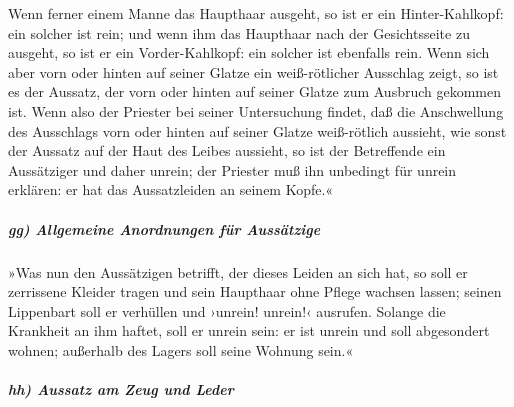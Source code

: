 Wenn ferner einem Manne das Haupthaar ausgeht, so ist er
ein Hinter-Kahlkopf: ein solcher ist rein; und wenn ihm
das Haupthaar nach der Gesichtsseite zu ausgeht, so ist er ein
Vorder-Kahlkopf: ein solcher ist ebenfalls rein. Wenn
sich aber vorn oder hinten auf seiner Glatze ein weiß-rötlicher
Ausschlag zeigt, so ist es der Aussatz, der vorn oder hinten auf seiner
Glatze zum Ausbruch gekommen ist. Wenn also der Priester
bei seiner Untersuchung findet, daß die Anschwellung des Ausschlags vorn
oder hinten auf seiner Glatze weiß-rötlich aussieht, wie sonst der
Aussatz auf der Haut des Leibes aussieht, so ist der
Betreffende ein Aussätziger und daher unrein; der Priester muß ihn
unbedingt für unrein erklären: er hat das Aussatzleiden an seinem
Kopfe.«

\hypertarget{gg-allgemeine-anordnungen-fuxfcr-aussuxe4tzige}{%
\subparagraph{gg) Allgemeine Anordnungen für
Aussätzige}\label{gg-allgemeine-anordnungen-fuxfcr-aussuxe4tzige}}

»Was nun den Aussätzigen betrifft, der dieses Leiden an
sich hat, so soll er zerrissene Kleider tragen und sein Haupthaar ohne
Pflege wachsen lassen; seinen Lippenbart soll er verhüllen und ›unrein!
unrein!‹ ausrufen. Solange die Krankheit an ihm haftet,
soll er unrein sein: er ist unrein und soll abgesondert wohnen;
außerhalb des Lagers soll seine Wohnung sein.«

\hypertarget{hh-aussatz-am-zeug-und-leder}{%
\subparagraph{hh) Aussatz am Zeug und
Leder}\label{hh-aussatz-am-zeug-und-leder}}

